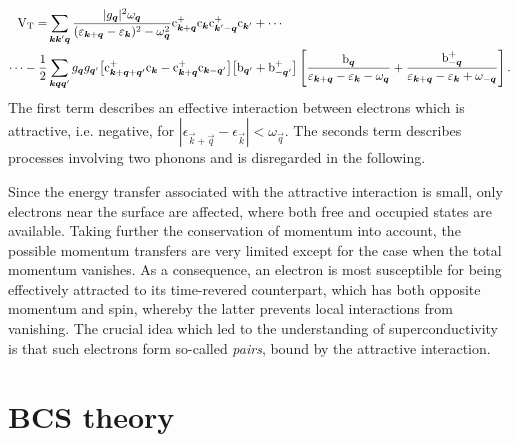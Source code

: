 %
\begin{align*}
    \mathrm V \sb{\text{T}} = &\sum_{\boldsymbol k \boldsymbol k' \boldsymbol q}
    \frac {|g_{\boldsymbol q}|^2 \omega_{\boldsymbol q}}
    {(\varepsilon_{\boldsymbol k + \boldsymbol q} - \varepsilon_{\boldsymbol k})^2 - \omega_{\boldsymbol q}^2}
    \mathrm c_{\boldsymbol k  + \boldsymbol q}^+ \mathrm c_{\boldsymbol k }
    \mathrm c_{\boldsymbol k' - \boldsymbol q}^+ \mathrm c_{\boldsymbol k'} + \cdots
    \\
    \cdots - \frac 1 2 &\sum_{\boldsymbol k \boldsymbol q \boldsymbol q'} g_{\boldsymbol q} g_{\boldsymbol q'}
    \big[ \mathrm c_{\boldsymbol k + \boldsymbol q + \boldsymbol q'}^+ \mathrm c_{\boldsymbol k}
    - \mathrm c_{\boldsymbol k + \boldsymbol q}^+ \mathrm c_{\boldsymbol k - \boldsymbol q'} \big]
    \big[ \mathrm b_{\boldsymbol q'} + \mathrm b_{-\boldsymbol q'}^+ \big] \left[
        \frac {\mathrm b_{\boldsymbol q}}
        {\varepsilon_{\boldsymbol k + \boldsymbol q} - \varepsilon_{\boldsymbol k} - \omega_{\boldsymbol q}}
        + \frac {\mathrm b_{-\boldsymbol q}^+}
        {\varepsilon_{\boldsymbol k + \boldsymbol q} - \varepsilon_{\boldsymbol k} + \omega_{-\boldsymbol q}}
    \right].
\end{align*}
%
The first term describes an effective interaction between electrons which is
attractive, i.e. negative, for $|\epsilon_{\vec k + \vec q} - \epsilon_{\vec k}|
< \omega_{\vec q}$. The seconds term describes processes involving two phonons
and is disregarded in the following.

Since the energy transfer associated with the attractive interaction is small,
only electrons near the  surface are affected, where both free and
occupied states are available. Taking further the conservation of momentum into
account, the possible momentum transfers are very limited except for the case
when the total momentum vanishes. As a consequence, an electron is most
susceptible for being effectively attracted to its time-revered counterpart,
which has both opposite momentum and spin, whereby the latter prevents local
interactions from vanishing. The crucial idea which led to the understanding of
superconductivity is that such electrons form so-called \emph{
pairs}, bound by the attractive interaction.

\section{BCS theory}

